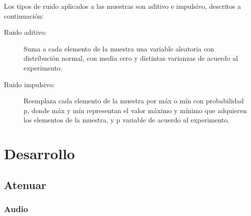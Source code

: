 \documentclass[a4paper,10pt,twoside]{article}
\begin{document}
Los tipos de ruido aplicados a las muestras son aditivo e impulsivo, descritos a continuación:

\begin{description}

\item[Ruido aditivo:]

Suma a cada elemento de la muestra una variable aleatoria con distribución normal, con media cero y distintas varianzas de acuerdo al experimento.

\item[Ruido impulsivo:]

Reemplaza cada elemento de la muestra por máx o mín con probabilidad p, donde máx y mín representan el valor máximo y mínimo que adquieren los elementos de la muestra, y p variable de acuerdo al experimento.

\end{description}








\section{Desarrollo}

\subsection{Atenuar}

\subsubsection{Audio}
\end{document}
